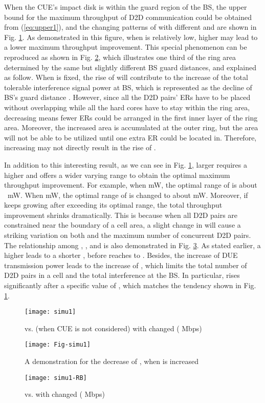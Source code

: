 \documentclass[journal, 10pt]{IEEEtran}
\begin{document}
When the CUE's impact disk is within the guard region of the BS, the
upper bound for the maximum throughput of D2D communication
 could be obtained from (\ref{eq:upper1}), and
the changing patterns of  with different
 and  are shown in Fig.
\ref{fig:simu1}. As demonstrated in this figure, when 
is relatively low, higher  may lead to a lower
maximum throughput improvement. This special phenomenon can be
reproduced as shown in Fig. \ref{fig:simu1-ex}, which illustrates one
third of the ring area determined by the same  but
slightly different BS guard distances, and explained as follow. When
 is fixed, the rise of  will
contribute to the increase of the total tolerable interference signal
power at BS, which is represented as the decline of BS's guard
distance . However, since all the D2D pairs' ERs have to
be placed without overlapping while all the hard cores have to stay
within the ring area, decreasing  means fewer ERs could
be arranged in the first inner layer of the ring area. Moreover, the
increased area is accumulated at the outer ring, but the area will not
be able to be utilized until one extra ER could be located in.
Therefore, increasing  may not directly result
in the rise of .  

In addition to this interesting result, as we can see in Fig.
\ref{fig:simu1}, larger  requires a higher
 and offers a wider varying range to obtain the
optimal maximum throughput improvement. For example, when
 mW, the optimal range of
 is about ~mW. When mW, the optimal range of  is changed
to about  mW. Moreover, if  keeps
growing after exceeding its optimal range, the total throughput
improvement shrinks dramatically. This is because when all D2D pairs
are constrained near the boundary of a cell area, a slight change in
 will cause a striking variation on both
 and the maximum number of concurrent D2D pairs. The
relationship among , , and
 is also demonstrated in Fig. \ref{fig:simu1b}.
As stated earlier, a higher  leads to a shorter
, before  reaches to .
Besides, the increase of DUE transmission power leads to the increase
of , which limits the total number of D2D pairs in a
cell and the total interference at the BS. In particular,
 rises significantly after a specific value of
, which matches the tendency shown in Fig.
\ref{fig:simu1}.

\begin{figure}[!htb]
\centering 
\texttt{[image: simu1]} 
\caption{ vs.  
(when CUE is not considered) with changed  
( Mbps) }\label{fig:simu1} 
\end{figure}
\begin{figure}[!htb]
\centering \texttt{[image: Fig-simu1]} \caption{A demonstration for the decrease of  , 
when  is increased}\label{fig:simu1-ex} 
\end{figure}
\begin{figure}[!htb]
\centering \texttt{[image: simu1-RB]} \caption{ vs.  with changed 
 ( Mbps)} \label{fig:simu1b} 
\end{figure}
\end{document}
